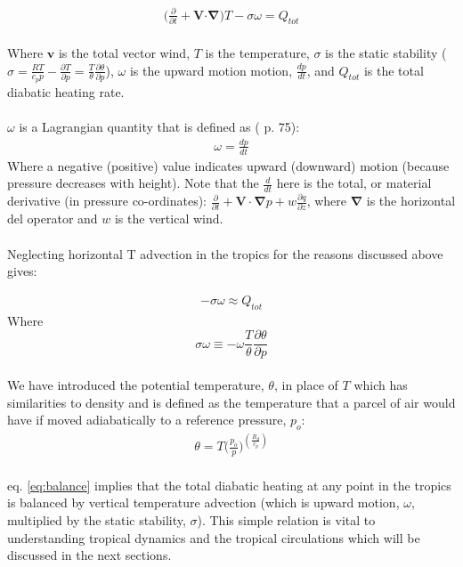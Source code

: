 \documentclass[letterpaper,12pt,titlepage,oneside,final]{book}
\begin{document}
\begin{align}
\Big(\frac{\partial}{\partial{t}}+\mathbf{V}\boldsymbol{\cdot} \mathbf{\nabla}\Big)T - \sigma\omega =Q_{tot}
\end{align}
\\
Where $\mathbf{v}$ is the total vector wind, $T$ is the temperature, $\sigma$ is the static stability ($\sigma=\frac{RT}{c_{p}p} - \frac{\partial{T}}{\partial{p}} = \frac{T}{\theta}\frac{\partial{\theta}}{\partial{p}}$), $\omega$ is the upward motion motion, $\frac{dp}{dt}$, and $Q_{tot}$ is the total diabatic heating rate. 
\\
\\
$\omega$ is a Lagrangian quantity that is defined as (\cite{holton_introduction_2004} p. 75):
\begin{align}\label{omega}
\omega=\frac{dp}{dt}
\end{align}
Where a negative (positive) value indicates upward (downward) motion (because pressure decreases with height). Note that the $\frac{d}{dt}$ here is the total, or material derivative (in pressure co-ordinates): $\frac{\partial}{\partial{t}} + \mathbf{V}\cdot\mathbf{\nabla}p + w\frac{\partial{q}}{\partial{z}}$, where $\mathbf{\nabla}$ is the horizontal del operator and $w$ is the vertical wind.
\\
\\
Neglecting horizontal T advection in the tropics for the reasons discussed above gives:

\begin{align}\label{eq:balance}
-\sigma\omega \approx{Q_{tot}}
\end{align}
Where
\begin{equation}\label{eq:sp}
  \sigma\omega\equiv-\omega\frac{T}{\theta}\frac{\partial{\theta}}{\partial{p}}
\end{equation}
\\
We have introduced the potential temperature, $\theta$, in place of $T$ which has similarities to density and is defined as the temperature that a parcel of air would have if moved adiabatically to a reference pressure, $p_{o}$:
\begin{align}
\theta=T\Big(\frac{p_{o}}{p}\Big)^{(\frac{R_{d}}{c_{p}})}
\end{align}
\\
eq. \ref{eq:balance} implies that the total diabatic heating at any point in the tropics is balanced by vertical temperature advection (which is upward motion, $\omega$, multiplied by the static stability, $\sigma$).
This simple relation is vital to understanding tropical dynamics and the tropical circulations which will be discussed in the next sections.
\end{document}
